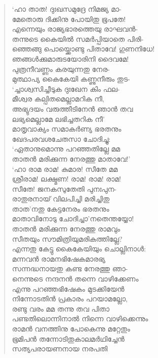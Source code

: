 \begin{verse}
‘ഹാ താത! ദുഃഖസമുദ്രേ നിമജ്യ മാ-\\
മേതൊരു ദിക്കിനു പോയിതു ഭൂപതേ!\\
എന്നെയും രാജ്യഭാരത്തെയു രാഘവന്‍-\\
തന്നുടെ കൈയില്‍ സമര്‍പ്പിയാതെ പിരി-\\
ഞ്ഞെങ്ങു പൊയ്ക്കൊണ്ടു പിതാവേ! ഗുണനിധേ!\\
ഞങ്ങള്‍ക്കുമാരുടയോരിനി ദൈവമേ!\\
പുത്രനീവണ്ണം കരയുന്നതു നേര-\\
മുത്ഥാപ്യ കൈകേയി കണ്ണുനീരും തുട-\\
‘ച്ചാശ്വസിച്ചീടുക ദുഃഖേന കിം ഫല-\\
മീശ്വര കല്പിതമെല്ലാമറിക നീ,\\
അഭ്യുദയം വരുത്തീടിനേന്‍ ഞാന്‍ തവ\\
ലഭ്യമെല്ലാമേ ലഭിച്ചതറിക നീ’\\
മാതൃവാക്യം സമാകര്‍ണ്യ ഭരതനും\\
ഖേദപരവശചേതസാ ചോദിച്ചു:\\
‘ഏതാനുമൊന്നു പറഞ്ഞതില്ലേ മമ\\
താതന്‍ മരിക്കുന്ന നേരത്തു മാതാവേ!’\\
‘ഹാ രാമ രാമ! കുമാര! സീതേ മമ\\
ശ്രീരാമ! ലക്ഷ്മണ! രാമ! രാമ! രാമ!\\
സീതേ! ജനകസുതേതി പുനഃപുന-\\
രാതുരനായ് വിലപിച്ചി മരിച്ചിതു\\
താത’നതു കേട്ടനേരം ഭരതനും\\
മാതാവിനോടു ചോദിച്ചാ’നതെന്തയ്യോ!\\
താതന്‍ മരിക്കുന്ന നേരത്തു രാമവും\\
സീതയും സൗമിത്രിയുമരികത്തില്ലേ?\\
എന്നതു കേട്ടു കൈകേയിയും ചൊല്ലിനാള്‍:\\
മന്നവ‍ന്‍ രാമനഭിഷേകമാരഭ്യ\\
സന്നദ്ധനായതു കണ്ട നേരത്തു ഞാ-\\
നെന്നുടെ നന്ദനന്‍ തന്നെ വാഴിക്കേണം\\
എന്നു പറഞ്ഞഭിഷേകം മുടക്കിയേന്‍\\
നിന്നോടതിന്‍ പ്രകാരം പറയാമല്ലോ,\\
രണ്ടു വരം മമ തന്നു തവ പിതാ\\
പണ്ടതിലൊന്നിനാല്‍ നിന്നെ വാഴിക്കെന്നും\\
രാമന്‍ വനത്തിനു പോകെന്നു മറ്റേതും\\
ഭൂമിപന്‍ തന്നോടിതുകാലമര്‍ഥിച്ചേന്‍\\
സത്യപരായണനായ നരപതി\\

\end{verse}
